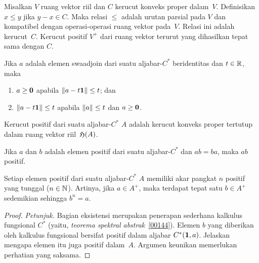 \begin{prop}\label{0018008} Misalkan $V$ ruang vektor riil dan $C$ kerucut konveks proper
dalam~$V$. Definisikan $x \le y$ jika $y - x \in C$. Maka relasi $\le$ adalah urutan parsial
pada $V$ dan kompatibel dengan operasi-operasi ruang vektor pada~$V$. Relasi ini adalah
 kerucut~$C$. Kerucut positif $V^+$ dari ruang vektor terurut yang dihasilkan
tepat sama dengan $C$.
\end{prop}

\begin{prop} Jika $a$ adalah elemen swaadjoin dari suatu aljabar-$C^*$ beridentitas dan $t \in \mathbb{R}$, maka
 \begin{enumerate}
   \item[(i)] $a \ge \mathbf{0}$ apabila $\lVert a - t\mathbf{1}\rVert \le t$; dan
   \item[(ii)] $\lVert a - t\mathbf{1}\rVert \le t$ apabila $\lVert a\rVert \le t$ dan $a \ge \mathbf{0}$.
  \end{enumerate}
\end{prop}

\begin{exam} Kerucut positif dari suatu aljabar-$C^*$ $A$ adalah kerucut konveks proper tertutup
dalam ruang vektor riil~$\mathfrak{H}(A)$.
\end{exam}

\begin{prop}\label{0018015} Jika $a$ dan $b$ adalah elemen positif dari suatu aljabar-$C^*$
dan $ab = ba$, maka $ab$ positif.
\end{prop}

\begin{prop}\label{001804} Setiap elemen positif dari suatu aljabar-$C^*$ $A$ memiliki akar pangkat
$n$ positif yang tunggal ($n \in \mathbb{N}$). Artinya, jika $a \in A^+$, maka terdapat tepat satu
$b \in A^+$ sedemikian sehingga $b^n = a$.
\end{prop}

\begin{proof} \emph{Petunjuk.} Bagian eksistensi merupakan penerapan sederhana kalkulus fungsional
$C^*$ (yaitu, \emph{teorema spektral abstrak}~\ref{00144}). Elemen $b$
yang diberikan oleh kalkulus fungsional bersifat positif dalam aljabar $C^*(\mathbf{1},a)$. Jelaskan mengapa
elemen itu juga positif dalam~$A$. Argumen keunikan memerlukan perhatian yang saksama. \ns
\end{proof}

